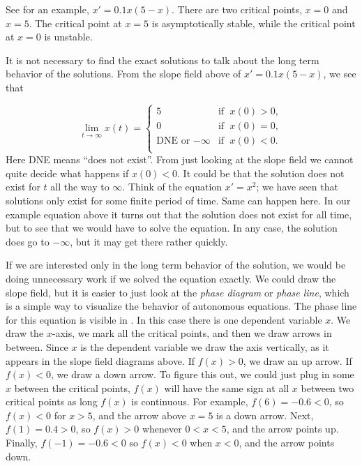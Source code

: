\documentclass{ximera}
\begin{document}
See  for an example, $x' = 0.1 x(5-x)$. There are two critical points, $x=0$ and $x=5$.  The critical point at $x=5$ is asymptotically stable, while the critical point at $x=0$ is unstable.

It is not necessary to find the exact solutions to talk about the long term behavior of the solutions.  From the slope field above of $x' = 0.1 x(5-x)$, we see that

\begin{equation*}
    \lim_{t\to \infty} x(t) = 
    \begin{cases}
        5 & \text{if } \; x(0) > 0 , \\
        0 & \text{if } \; x(0) = 0 , \\
        \text{DNE or } {-\infty} & \text{if } \; x(0) < 0 . \\
    \end{cases}
\end{equation*}
Here DNE means ``does not exist''. From just looking at the slope field we cannot quite decide what happens if $x(0) < 0$.  It could be that the solution does not exist for $t$ all the way to $\infty$. Think of the equation $x' = x^2$; we have seen that solutions only exist for some finite period of time.  Same can happen here. In our example equation above it turns out that the solution does not exist for all time, but to see that we would have to solve the equation.  In any case, the solution does go to $-\infty$, but it may get there rather quickly.


If we are interested only in the long term behavior of the solution, we would be doing unnecessary work if we solved the equation exactly. We could draw the slope field, but it is easier to just look at the \emph{phase diagram} or \emph{phase line}, which is a simple way to visualize the behavior of autonomous equations.  The phase line for this equation is visible in . In this case there is one dependent variable $x$. We draw the $x$-axis, we mark all the critical points, and then we draw arrows in between.  Since $x$ is the dependent variable we draw the axis vertically, as it appears in the slope field diagrams above. If $f(x) > 0$, we draw an up arrow.  If $f(x) < 0$, we draw a down arrow. To figure this out, we could just plug in some $x$ between the critical points, $f(x)$ will have the same sign at all $x$ between two critical points as long $f(x)$ is continuous. For example, $f(6) = -0.6 < 0$, so $f(x) < 0$ for $x > 5$, and the arrow above $x=5$ is a down arrow.  Next, $f(1) = 0.4 > 0$, so $f(x) > 0$ whenever $0 < x < 5$, and the arrow points up.  Finally, $f(-1) = -0.6 < 0$ so $f(x) < 0$ when $x < 0$, and the arrow points down.
\end{document}
